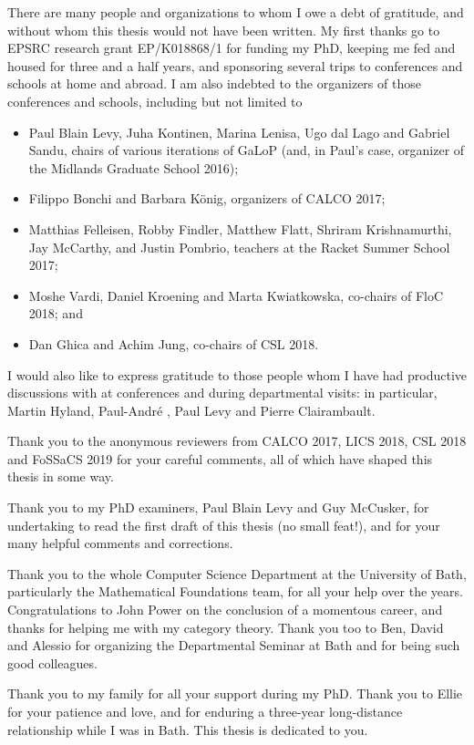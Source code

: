 \documentclass[11pt, a4paper, notitlepage]{report}
\begin{document}
There are many people and organizations to whom I owe a debt of gratitude, and without whom this thesis would not have been written.  
My first thanks go to EPSRC research grant EP/K018868/1 for funding my PhD, keeping me fed and housed for three and a half years, and sponsoring several trips to conferences and schools at home and abroad.  
I am also indebted to the organizers of those conferences and schools, including but not limited to 
\begin{itemize}
  \item Paul Blain Levy, Juha Kontinen, Marina Lenisa, Ugo dal Lago and Gabriel Sandu, chairs of various iterations of GaLoP (and, in Paul's case, organizer of the Midlands Graduate School 2016);
  \item Filippo Bonchi and Barbara K\"{o}nig, organizers of CALCO 2017;
  \item Matthias Felleisen, Robby Findler, Matthew Flatt, Shriram Krishnamurthi, Jay McCarthy, and Justin Pombrio, teachers at the Racket Summer School 2017;
  \item Moshe Vardi, Daniel Kroening and Marta Kwiatkowska, co-chairs of FloC 2018; and
  \item Dan Ghica and Achim Jung, co-chairs of CSL 2018.
\end{itemize}
I would also like to express gratitude to those people whom I have had productive discussions with at conferences and during departmental visits: in particular, Martin Hyland, Paul-Andr\'{e} \Mellies, Paul Levy and Pierre Clairambault.

Thank you to the anonymous reviewers from CALCO 2017, LICS 2018, CSL 2018 and FoSSaCS 2019 for your careful comments, all of which have shaped this thesis in some way.

Thank you to my PhD examiners, Paul Blain Levy and Guy McCusker, for undertaking to read the first draft of this thesis (no small feat!), and for your many helpful comments and corrections.  

Thank you to the whole Computer Science Department at the University of Bath, particularly the Mathematical Foundations team, for all your help over the years.  
Congratulations to John Power on the conclusion of a momentous career, and thanks for helping me with my category theory.  
Thank you too to Ben, David and Alessio for organizing the Departmental Seminar at Bath and for being such good colleagues.

Thank you to my family for all your support during my PhD.  
Thank you to Ellie for your patience and love, and for enduring a three-year long-distance relationship while I was in Bath.  
This thesis is dedicated to you.
\end{document}
